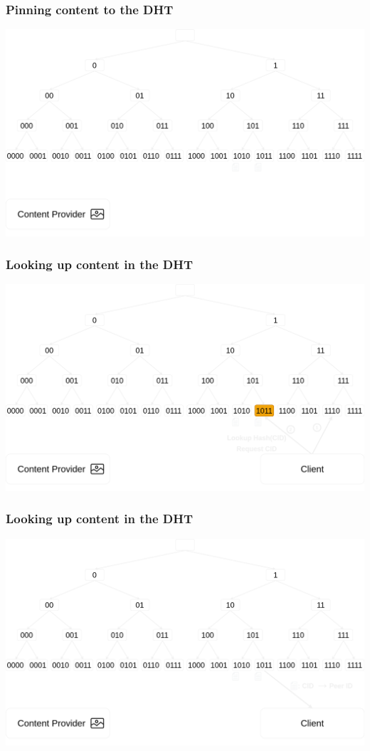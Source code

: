 \documentclass{pl-slide}
\begin{document}
\begin{frame}
\frametitle{Pinning content to the DHT}
\begin{minipage}[b]{\linewidth}
\begin{center}
	\includegraphics[width=.8\linewidth,keepaspectratio]{resources/dht/dht-provider-records.png}
\end{center}
\end{minipage}
\end{frame}

\begin{frame}
\frametitle{Looking up content in the DHT}
\begin{minipage}[b]{\linewidth}
\begin{center}
	\includegraphics[width=.8\linewidth,keepaspectratio]{resources/dht/dht-client-lookup.png}
\end{center}
\end{minipage}
\end{frame}

\begin{frame}
\frametitle{Looking up content in the DHT}
\begin{minipage}[b]{\linewidth}
\begin{center}
	\includegraphics[width=.8\linewidth,keepaspectratio]{resources/dht/dht-provider-record-fetch.png}
\end{center}
\end{minipage}
\end{frame}
\end{document}
